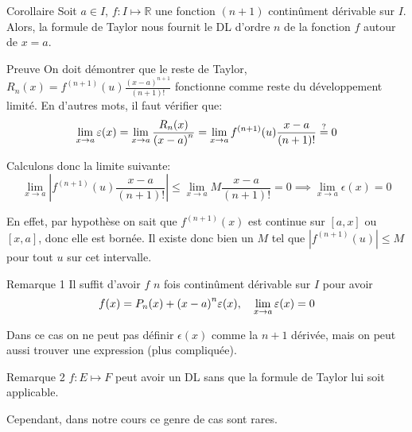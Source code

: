 \documentclass[a4paper]{article}
\begin{document}
\begin{parag}{Corollaire}
    Soit $a \in I$, $f : I \mapsto \mathbb{R}$ une fonction $\left(n+1\right)$ continûment dérivable sur $I$. Alors, la formule de Taylor nous fournit le DL d'ordre $n$ de la fonction $f$ autour de $x = a$.

    \begin{subparag}{Preuve}
        On doit démontrer que le reste de Taylor, $R_n\left(x\right) = f^{\left(n+1\right)}\left(u\right) \frac{\left(x-a\right)^{n+1}}{\left(n+1\right)!}$ fonctionne comme reste du développement limité. En d'autres mots, il faut vérifier que:
        \[\lim_{x \to a} \epsilon\left(x\right) = \lim_{x \to a} \frac{R_n\left(x\right)}{\left(x - a\right)^n}= \lim_{x \to a} f^{\left(n+1\right)}\left(u\right) \frac{x - a}{\left(n+1\right)!} \over{=}{?} 0\]

        Calculons donc la limite suivante:
        \[\lim_{x \to a} \left|f^{\left(n+1\right)}\left(u\right) \frac{x-a}{\left(n+1\right)!}\right| \leq \lim_{x \to a} M \frac{x-a}{\left(n+1\right)!} = 0 \implies \lim_{x \to a} \epsilon\left(x\right) = 0\]

        En effet, par hypothèse on sait que $f^{\left(n+1\right)}\left(x\right)$ est continue sur $\left[a, x\right]$ ou $\left[x, a\right]$, donc elle est bornée. Il existe donc bien un $M$ tel que $\left|f^{\left(n+1\right)}\left(u\right)\right| \leq M$ pour tout $u$ sur cet intervalle.
    \end{subparag}

    \begin{subparag}{Remarque 1}
        Il suffit d'avoir $f$ $n$ fois continûment dérivable sur $I$ pour avoir
        \[f\left(x\right) = P_n\left(x\right) + \left(x - a\right)^{n} \epsilon\left(x\right), \mathspace \lim_{x \to a} \epsilon\left(x\right) = 0\]

        Dans ce cas on ne peut pas définir $\epsilon\left(x\right)$ comme la $n+1$ dérivée, mais on peut aussi trouver une expression (plus compliquée).
    \end{subparag}

    \begin{subparag}{Remarque 2}
        $f : E \mapsto F$ peut avoir un DL sans que la formule de Taylor lui soit applicable.

        Cependant, dans notre cours ce genre de cas sont rares.
    \end{subparag}
\end{parag}
\end{document}
